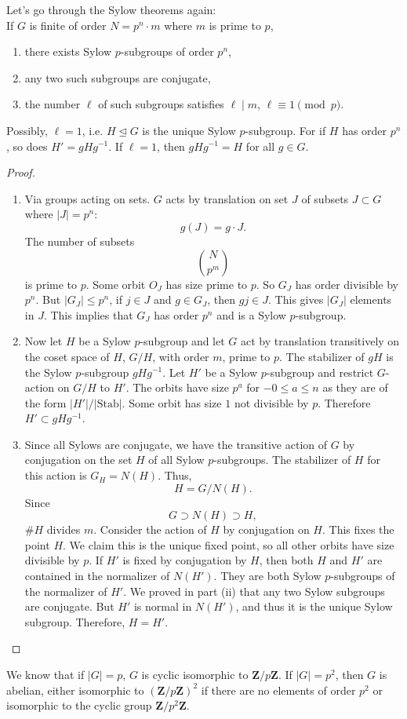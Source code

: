 \documentclass[11pt, oneside]{amsart}
\numberwithin{equation}{section}
\numberwithin{theorem}{section}
\theoremstyle{definition}
\def\Z{\mathbf{Z}}
\begin{document}
{Let's go through the Sylow theorems again:\\
If $G$ is finite of order $N= p^n\cdot m$ where $m$ is prime to $p$, 
\begin{enumerate}[label=(\roman*)]
\item there exists Sylow $p$-subgroups of order $p^n$,
\item any two such subgroups are conjugate,
\item the number $\ell$ of such subgroups satisfies $\ell \mid m$, $\ell \equiv 1 \pmod p$.
\end{enumerate}
Possibly, $\ell= 1$, i.e. $H\unlhd G$ is the unique Sylow $p$-subgroup. For if $H$ has order $p^n$, so does $H' = gHg^{-1}$. If $\ell=1$, then $gHg^{-1}= H$ for all $g\in G$.
\begin{proof} \textrm{}
\begin{enumerate}[label=(\roman*)]
\item Via groups acting on sets. $G$ acts by translation on set $J$ of subsets $J\subset G$ where $|J| = p^n$: 
$$
g(J) = g\cdot J. 
$$
The number of subsets $$\binom{N}{p^m}$$ is prime to $p$. Some orbit $O_J$ has size prime to $p$. So $G_J$ has order divisible by $p^n$. But $|G_J| \leqslant p^n$, if $j\in J$ and $g\in G_J$, then $gj \in J$. This gives $|G_J|$ elements in $J$. This implies that $G_J$ has order $p^n$ and is a Sylow $p$-subgroup.
\item Now let $H$ be a Sylow $p$-subgroup and let $G$ act by translation transitively on the coset space of $H$, $G/H$, with order $m$, prime to $p$. The stabilizer of $gH$ is the Sylow $p$-subgroup $gHg^{-1}$. Let $H'$ be a Sylow $p$-subgroup and restrict $G$-action on $G/H$ to $H'$. The orbits have size $p^a$ for $-0\leqslant a \leqslant n$ as they are of the form $|H'|/|\textrm{Stab}|$. Some orbit has size $1$ not divisible by $p$. Therefore $H'\subset gHg^{-1}$. 
\item Since all Sylows are conjugate, we have the transitive action of $G$ by conjugation on the set $H$ of all Sylow $p$-subgroups. The stabilizer of $H$ for this action is $G_H = N(H)$. Thus,
$$
H = G/N(H).
$$ 
Since 
$$
G\supset N(H) \supset H,
$$
$\# H$ divides $m$. Consider the action of $H$ by conjugation on $H$. This fixes the point $H$. We claim this is the unique fixed point, so all other orbits have size divisible by $p$. If $H'$ is fixed by conjugation by $H$, then both $H$ and $H'$ are contained in the normalizer of $N(H')$. They are both Sylow $p$-subgroups of the normalizer of $H'$. We proved in part (ii) that any two Sylow subgroups are conjugate. But $H'$ is normal in $N(H')$, and thus it is the unique Sylow subgroup. Therefore, $H=H'$.
\end{enumerate}
\end{proof}
We know that if $|G| = p$, $G $ is cyclic isomorphic to $\Z/p\Z$. If $|G| = p^2$, then $G$ is abelian, either isomorphic to $(\Z/p\Z)^2$ if there are no elements of order $p^2$ or isomorphic to the cyclic group $\Z/p^2\Z$. 

}
\end{document}
